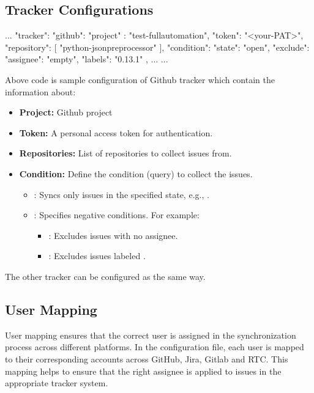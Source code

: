 \subsection{Tracker Configurations}
\begin{pythoncode}
{
   ...
   "tracker": {
      "github": {
         "project" : "test-fullautomation",
         "token": "<your-PAT>",
         "repository": [
            "python-jsonpreprocessor"
         ],
         "condition": {
            "state": "open",
            "exclude": {
               "assignee": "empty",
               "labels": "0.13.1"
            }
         }
      },
      ...
   }
   ...
}
\end{pythoncode}

Above code is sample configuration of Github tracker which contain the
information about:

\begin{itemize}
    \item \textbf{Project:} Github project 
    \item \textbf{Token:} A personal access token for authentication.
    \item \textbf{Repositories:} List of repositories to collect issues from.
    \item \textbf{Condition:} Define the condition (query) to collect the issues.
          \begin{itemize}
            \item {}: Syncs only issues in the specified state,
                  e.g., .
            \item {}: Specifies negative conditions. For example:
            \begin{itemize}
               \item {}: Excludes issues with no assignee.
               \item {}: Excludes issues labeled .
            \end{itemize}
          \end{itemize}
\end{itemize}

The other tracker can be configured as the same way.

\subsection{User Mapping}
User mapping ensures that the correct user is assigned in the synchronization
process across different platforms.
In the configuration file, each user is mapped to their corresponding accounts
across GitHub, Jira, Gitlab and RTC. This mapping helps to ensure that the right
assignee is applied to issues in the appropriate tracker system.

